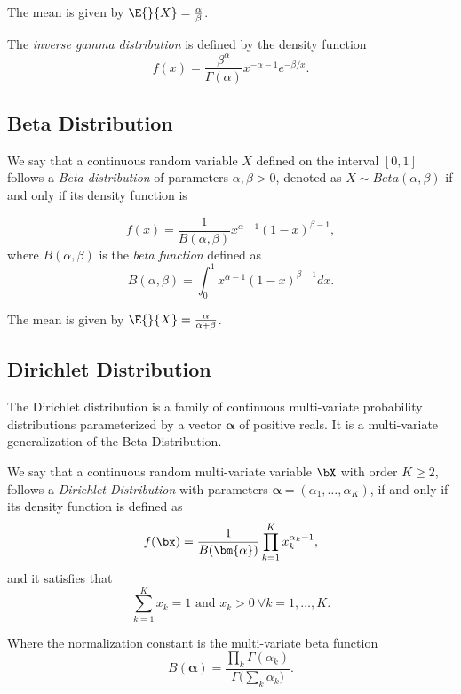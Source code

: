 The mean is given by \(\E{}{X} = \frac{\alpha}{\beta}\).

\begin{definition}
The \emph{inverse gamma distribution} is defined by the density function
\[
  f(x) =  \frac{\beta^{\alpha}}{\Gamma(\alpha)} x^{-\alpha-1}e^{-\beta/x}.
\]
\end{definition}


\subsection{Beta Distribution}

\begin{definition}
We say that a continuous random variable \(X\) defined on the
interval \([0,1]\) follows a \emph{Beta distribution} of parameters \(\alpha,
\beta > 0\), denoted as \(X \sim Beta(\alpha, \beta)\) if and only if its
density function is

\[
  f(x) = \frac{1}{B(\alpha, \beta)}x^{\alpha - 1}(1-x)^{\beta -1},
\]
where \(B(\alpha, \beta)\) is the \emph{beta function} defined as
\[
  B(\alpha, \beta) = \int_0^1 x^{\alpha - 1}(1-x)^{\beta -1} dx.
\]
\end{definition}

The mean is given by \(\E{}{X} = \frac{\alpha}{\alpha + \beta}\).

\subsection{Dirichlet Distribution}

The Dirichlet distribution is a family of continuous multi-variate probability
distributions parameterized by a vector \(\bm{\alpha}\) of positive reals. It is
a multi-variate generalization of the Beta Distribution.

\begin{definition}
  We say that a continuous random multi-variate variable \(\bX\) with order
  \(K \geq 2\), follows a \emph{Dirichlet
    Distribution} with parameters \(\bm{\alpha} = (\alpha_{1}, \dots, \alpha_{K})\), if and
  only if its density function is defined as
  \[
    f(\bx) = \frac{1}{B(\bm{\alpha})}\prod_{k = 1}^{K}x_{k}^{\alpha_{k}-1},
  \]
  and it satisfies that
  \[
    \sum_{k=1}^{K} x_{k} = 1 \text{ and } x_{k} > 0 \ \forall k=1,\dots,K.
  \]
\end{definition}

Where the normalization constant is the multi-variate beta function
\[
  B(\bm{\alpha}) = \frac{\prod_{k} \Gamma (\alpha_{k})}{\Gamma \big( \sum_{k}\alpha_{k} \big)}.
\]

